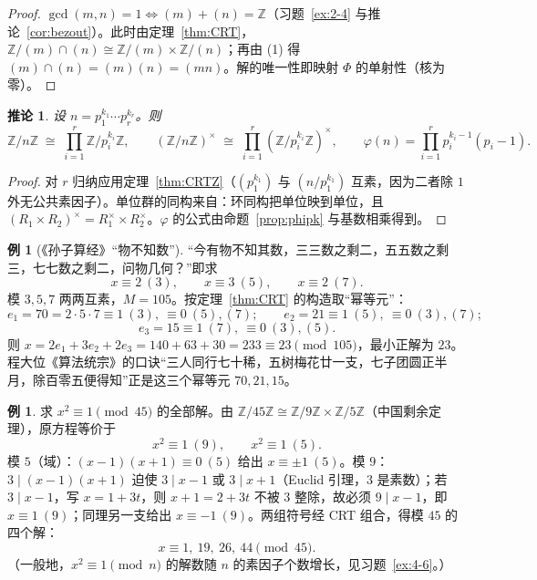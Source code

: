\documentclass[a4paper,11pt]{ctexart}
\numberwithin{equation}{section}
\theoremstyle{plain}
\newtheorem{corollary}[theorem]{推论}
\theoremstyle{definition}
\newtheorem{example}[theorem]{例}
\theoremstyle{remark}
\newcommand{\Z}{\mathbb{Z}}
\begin{document}
\begin{proof}
$\gcd(m,n)=1\iff (m)+(n)=\Z$（习题~\ref{ex:2-4} 与推论~\ref{cor:bezout}）。此时由定理~\ref{thm:CRT}，$\Z/(m)\cap(n)\cong\Z/(m)\times\Z/(n)$；再由 (1) 得 $(m)\cap(n)=(m)(n)=(mn)$。解的唯一性即映射 $\Phi$ 的单射性（核为零）。
\end{proof}

\begin{corollary}\label{cor:CRTn}
设 $n=p_1^{k_1}\cdots p_r^{k_r}$。则
\[
\Z/n\Z\;\cong\;\prod_{i=1}^{r}\Z/p_i^{k_i}\Z,
\qquad
(\Z/n\Z)^{\times}\;\cong\;\prod_{i=1}^{r}(\Z/p_i^{k_i}\Z)^{\times},
\qquad
\varphi(n)=\prod_{i=1}^{r}p_i^{k_i-1}(p_i-1).
\]
\end{corollary}

\begin{proof}
对 $r$ 归纳应用定理~\ref{thm:CRTZ}（$(p_1^{k_1})$ 与 $(n/p_1^{k_1})$ 互素，因为二者除 $1$ 外无公共素因子）。单位群的同构来自：环同构把单位映到单位，且 $(R_1\times R_2)^{\times}=R_1^{\times}\times R_2^{\times}$。$\varphi$ 的公式由命题~\ref{prop:phipk} 与基数相乘得到。
\end{proof}

\begin{example}[《孙子算经》“物不知数”]\label{ex:sunzi}
“今有物不知其数，三三数之剩二，五五数之剩三，七七数之剩二，问物几何？”即求
\[
x\equiv 2\ (3),\qquad x\equiv 3\ (5),\qquad x\equiv 2\ (7).
\]
模 $3,5,7$ 两两互素，$M=105$。按定理~\ref{thm:CRT} 的构造取“幂等元”：
\[
e_1=70=2\cdot5\cdot 7\equiv 1\ (3),\ \equiv 0\ (5),(7);\qquad
e_2=21\equiv 1\ (5),\ \equiv0\ (3),(7);
\]
\[
e_3=15\equiv 1\ (7),\ \equiv 0\ (3),(5).
\]
则 $x=2e_1+3e_2+2e_3=140+63+30=233\equiv 23 \pmod{105}$，最小正解为 $23$。程大位《算法统宗》的口诀“三人同行七十稀，五树梅花廿一支，七子团圆正半月，除百零五便得知”正是这三个幂等元 $70,21,15$。
\end{example}

\begin{example}
求 $x^2\equiv 1 \pmod{45}$ 的全部解。由 $\Z/45\Z\cong\Z/9\Z\times\Z/5\Z$（中国剩余定理），原方程等价于
\[
x^2\equiv1\ (9),\qquad x^2\equiv1\ (5).
\]
模 $5$（域）：$(x-1)(x+1)\equiv0\ (5)$ 给出 $x\equiv\pm1\ (5)$。模 $9$：$3\mid(x-1)(x+1)$ 迫使 $3\mid x-1$ 或 $3\mid x+1$（Euclid 引理，$3$ 是素数）；若 $3\mid x-1$，写 $x=1+3t$，则 $x+1=2+3t$ 不被 $3$ 整除，故必须 $9\mid x-1$，即 $x\equiv1\ (9)$；同理另一支给出 $x\equiv-1\ (9)$。两组符号经 CRT 组合，得模 $45$ 的四个解：
\[
x\equiv 1,\ 19,\ 26,\ 44 \pmod{45}.
\]
（一般地，$x^2\equiv1\pmod n$ 的解数随 $n$ 的素因子个数增长，见习题~\ref{ex:4-6}。）
\end{example}
\end{document}
